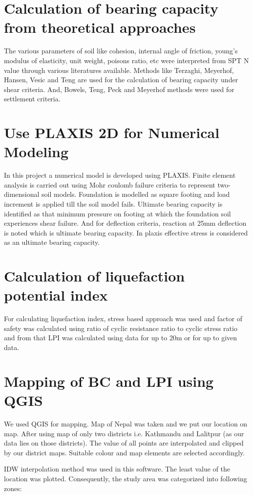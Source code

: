 \section{Calculation of bearing capacity from theoretical approaches}
The various parameters of soil like cohesion, internal angle of friction, young’s modulus of elasticity, unit weight, poisons ratio, etc were interpreted from SPT N value through various literatures available. Methods like Terzaghi, Meyerhof, Hansen, Vesic and Teng are used for the calculation of bearing capacity under shear criteria. And, Bowels, Teng, Peck and Meyerhof methods were used for settlement criteria.

\section{Use PLAXIS 2D for Numerical Modeling}
In this project a numerical model is developed using PLAXIS. Finite element analysis is carried out using Mohr coulomb failure criteria to represent two-dimensional soil models. Foundation is modelled as square footing and load increment is applied till the soil model fails. Ultimate bearing capacity is identified as that minimum pressure on footing at which the foundation soil experiences shear failure. And for deflection criteria, reaction at 25mm deflection is noted which is ultimate bearing capacity. In plaxis effective stress is considered as an ultimate bearing capacity.

\section{Calculation of liquefaction potential index}
For calculating liquefaction index, stress based approach was used and factor of safety was calculated using ratio of cyclic resistance ratio to cyclic stress ratio and from that LPI was calculated using data for up to 20m or for up to given data.

\section{Mapping of BC and LPI using QGIS}
We used QGIS for mapping. Map of Nepal was taken and we put our location on map. After using map of only two districts i.e. Kathmandu and Lalitpur (as our data lies on those districts). The value of all points are interpolated and clipped by our district maps. Suitable colour and map elements are selected accordingly.

IDW interpolation method was used in this software. The least value of the location was plotted. Consequently, the study area was categorized into following zones:

